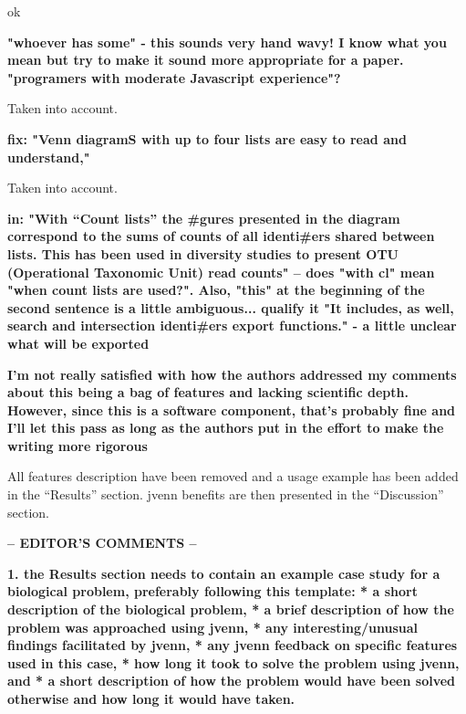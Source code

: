 \documentclass[10pt,stdletter,dateno,sigleft]{newlfm} %
\begin{document}
\begin{newlfm}
ok


\textbf{"whoever has some" - this sounds very hand wavy! I know what you mean
but try to make it sound more appropriate for a paper. "programers with moderate
Javascript experience"?}

Taken into account.


\textbf{fix: "Venn diagramS with up to four lists are easy to read and
understand,"}

Taken into account.


\textbf{in: "With “Count lists” the #gures presented in the diagram
correspond to the sums of counts of all identi#ers shared between lists. This has
been used in diversity studies to present OTU (Operational Taxonomic Unit) read
counts" -- does "with cl" mean "when count lists are used?". Also, "this" at the
beginning of the second sentence is a little ambiguous... qualify it
"It includes, as well, search and intersection identi#ers export functions." - a little
unclear what will be exported}



\textbf{I'm not really satisfied with how the authors addressed my comments
about this being a bag of features and lacking scientific depth. However, since
this is a software component, that's probably fine and I'll let this pass as long
as the authors put in the effort to make the writing more rigorous}

All features description have been removed and a usage example has been added in
the ``Results'' section. jvenn benefits are then presented in the ``Discussion''
section.


\textbf{-- EDITOR'S COMMENTS --}

\textbf{1. the Results section needs to contain an example case study for a
biological problem, preferably following this template:\newline
* a short description of the biological problem, \newline
* a brief description of how the problem was approached using jvenn, \newline
* any interesting/unusual findings facilitated by jvenn, \newline
* any jvenn feedback on specific features used in this case, \newline
* how long it took to solve the problem using jvenn, and \newline
* a short description of how the problem would have been solved otherwise and
how long it would have taken.\newline}


\end{newlfm}
\end{document}
